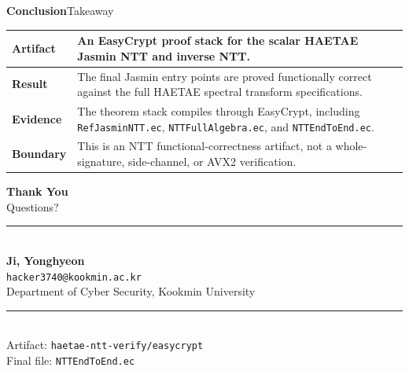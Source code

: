 \documentclass[10pt,aspectratio=1610,compress,dvipsnames]{beamer}
\newcommand{\ec}[1]{\texttt{#1}}
\begin{document}
\begin{frame}{\bfseries Conclusion}{Takeaway}
\begin{center}
\renewcommand{\arraystretch}{1.55}
\begin{tabular}{p{2.6cm}p{10.0cm}}
\toprule[1.2pt]
\rowcolor{cseblue!10}
\textbf{Artifact} &
An EasyCrypt proof stack for the scalar HAETAE Jasmin NTT and inverse NTT. \\
\midrule
\rowcolor{green!10}
\textbf{Result} &
The final Jasmin entry points are proved functionally correct against the full
HAETAE spectral transform specifications. \\
\midrule
\rowcolor{yellow!14}
\textbf{Evidence} &
The theorem stack compiles through EasyCrypt, including \ec{RefJasminNTT.ec},
\ec{NTTFullAlgebra.ec}, and \ec{NTTEndToEnd.ec}. \\
\midrule
\rowcolor{red!7}
\textbf{Boundary} &
This is an NTT functional-correctness artifact, not a whole-signature,
side-channel, or AVX2 verification. \\
\bottomrule[1.2pt]
\end{tabular}
\end{center}
\end{frame}

{\1\begin{frame}
\begin{center}
  {\Large\bfseries\color{cseblue}Thank You}\\[1.2cm]
  {\large Questions?}\\[1.0cm]
  \rule{0.45\textwidth}{0.4pt}\\[0.7cm]
  \textbf{Ji, Yonghyeon}\\[0.3cm]
  \texttt{hacker3740@kookmin.ac.kr}\\[0.3cm]
  Department of Cyber Security, Kookmin University\\[0.8cm]
  \rule{0.45\textwidth}{0.4pt}\\[0.5cm]
  {\small\color{gray}
  Artifact: \ec{haetae-ntt-verify/easycrypt}\\[3pt]
  Final file: \ec{NTTEndToEnd.ec}
  }
\end{center}
\end{frame}}
\end{document}
